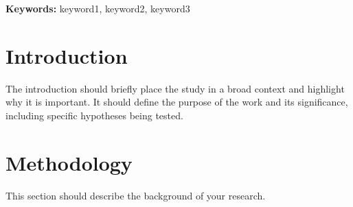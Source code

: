 \documentclass[11pt]{article}
\begin{document}


\noindent\textbf{Keywords:} keyword1, keyword2, keyword3

\section{Introduction}
The introduction should briefly place the study in a broad context and highlight why it is important. It should define the purpose of the work and its significance,\cite{Keshav-SIGCOMMCCR2007} including specific hypotheses being tested.

\section{Methodology}
This section should describe the background of your research.

\printbibliography
\end{document}
